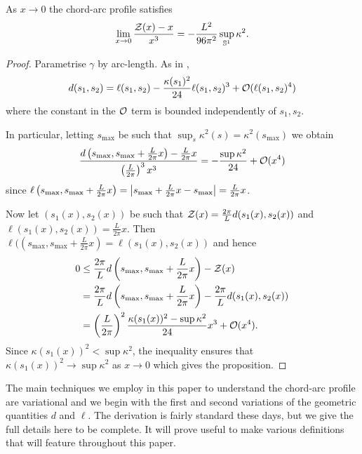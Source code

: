\documentclass[a4paper, 12pt]{amsart}
\begin{document}
\begin{prop}
\label{prop:asymptotics}
As $x\to 0$ the chord-arc profile satisfies
\[
\lim_{x\to 0} \frac{\operatorname{\mathcal{Z}}(x) - x}{x^3} = - \frac{L^2}{96\pi^2} \sup_{\mathbb{S}^1} \kappa^2.
\]
\end{prop}

\begin{proof}
Parametrise $\gamma$ by arc-length. As in \cite{MR2794630}, 
\[
d(s_1, s_2) = \ell(s_1,s_2) - \frac{\kappa(s_1)^2}{24} \ell(s_1,s_2)^3 + \operatorname{\mathcal{O}}(\ell(s_1, s_2)^4)
\]
where the constant in the $\operatorname{\mathcal{O}}$ term is bounded independently of $s_1,s_2$.

In particular, letting $s_{\max}$ be such that $\sup_s \kappa^2(s) = \kappa^2(s_{\max})$ we obtain
\[
\frac{d\left(s_{\max}, s_{\max} + \frac{L}{2\pi} x\right) - \frac{L}{2\pi}x}{\left(\tfrac{L}{2\pi}\right)^3 x^3} = -\frac{\sup \kappa^2}{24} + \operatorname{\mathcal{O}}(x^4)
\]
since $\ell\left(s_{\max}, s_{\max} + \frac{L}{2\pi} x\right) = \left\lvert{s_{\max} + \frac{L}{2\pi} x - s_{\max}}\right\rvert = \frac{L}{2\pi} x$.

Now let $(s_1(x), s_2(x))$ be such that $\operatorname{\mathcal{Z}}(x) = \frac{2\pi}{L} d(s_1(x), s_2(x))$ and $\ell(s_1(x), s_2(x)) = \frac{L}{2\pi} x$. Then $\ell(\left(s_{\max}, s_{\max} + \tfrac{L}{2\pi} x\right) = \ell(s_1(x), s_2(x))$ and hence
\[
\begin{split}
0 &\leq \frac{2\pi}{L}d\left(s_{\max}, s_{\max} + \frac{L}{2\pi}x\right) - \operatorname{\mathcal{Z}}(x) \\
&= \frac{2\pi}{L}d\left(s_{\max}, s_{\max} + \frac{L}{2\pi}x\right) - \frac{2\pi}{L} d(s_1(x), s_2(x)) \\
&= \left(\frac{L}{2\pi}\right)^2 \frac{\kappa(s_1(x))^2 - \sup \kappa^2}{24} x^3 + \operatorname{\mathcal{O}}(x^4).
\end{split}
\]
Since $\kappa(s_1(x))^2 < \sup \kappa^2$, the inequality ensures that $\kappa(s_1(x))^2 \to \sup \kappa^2$ as $x\to 0$ which gives the proposition.
\end{proof}

The main techniques we employ in this paper to understand the chord-arc profile are variational and we begin with the first and second variations of the geometric quantities $d$ and $\ell$. The derivation is fairly standard these days, but we give the full details here to be complete. It will prove useful to make various definitions that will feature throughout this paper.
\end{document}
